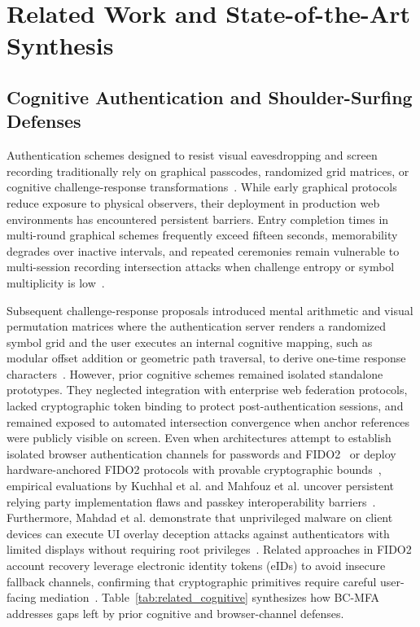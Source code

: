\section{Related Work and State-of-the-Art Synthesis}
\label{sec:related_work}

\subsection{Cognitive Authentication and Shoulder-Surfing Defenses}
Authentication schemes designed to resist visual eavesdropping and screen recording traditionally rely on graphical passcodes, randomized grid matrices, or cognitive challenge-response transformations~\cite{abdelkarim2024online, binbeshr2025challenge, duzgun2022shoulder}. While early graphical protocols reduce exposure to physical observers, their deployment in production web environments has encountered persistent barriers. Entry completion times in multi-round graphical schemes frequently exceed fifteen seconds, memorability degrades over inactive intervals, and repeated ceremonies remain vulnerable to multi-session recording intersection attacks when challenge entropy or symbol multiplicity is low~\cite{duzgun2022shoulder, binbeshr2025challenge}.

Subsequent challenge-response proposals introduced mental arithmetic and visual permutation matrices where the authentication server renders a randomized symbol grid and the user executes an internal cognitive mapping, such as modular offset addition or geometric path traversal, to derive one-time response characters~\cite{binbeshr2025challenge}. However, prior cognitive schemes remained isolated standalone prototypes. They neglected integration with enterprise web federation protocols, lacked cryptographic token binding to protect post-authentication sessions, and remained exposed to automated intersection convergence when anchor references were publicly visible on screen. Even when architectures attempt to establish isolated browser authentication channels for passwords and FIDO2~\cite{gautam2025passwords} or deploy hardware-anchored FIDO2 protocols with provable cryptographic bounds~\cite{bindel2023fido2}, empirical evaluations by Kuchhal et al. and Mahfouz et al. uncover persistent relying party implementation flaws and passkey interoperability barriers~\cite{kuchhal2023evaluating, mahfouz2025passkeys}. Furthermore, Mahdad et al. demonstrate that unprivileged malware on client devices can execute UI overlay deception attacks against authenticators with limited displays without requiring root privileges~\cite{mahdad2024breaching}. Related approaches in FIDO2 account recovery leverage electronic identity tokens (eIDs) to avoid insecure fallback channels, confirming that cryptographic primitives require careful user-facing mediation~\cite{schwarz2022feido}. Table~\ref{tab:related_cognitive} synthesizes how BC-MFA addresses gaps left by prior cognitive and browser-channel defenses.

